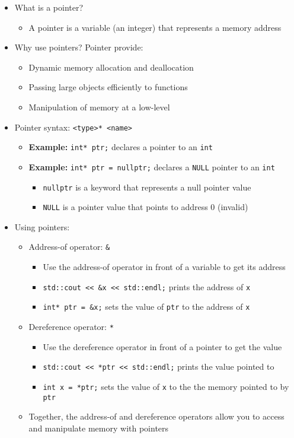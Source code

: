 \documentclass{article}
\begin{document}
\begin{itemize}
	\item What is a pointer?
	\begin{itemize}
		\item A pointer is a variable (an integer) that represents a memory address
	\end{itemize}
	\item Why use pointers? Pointer provide:
	\begin{itemize}
		\item Dynamic memory allocation and deallocation
		\item Passing large objects efficiently to functions
		\item Manipulation of memory at a low-level
	\end{itemize}
	\item Pointer syntax: \texttt{<type>* <name>}
	\begin{itemize}
		\item \textbf{Example:} \texttt{int* ptr;} declares a pointer to an \texttt{int}
		\item \textbf{Example:} \texttt{int* ptr = nullptr;} declares a \texttt{NULL} pointer to an \texttt{int}
		\begin{itemize}
			\item \texttt{nullptr} is a keyword that represents a null pointer value
			\item \texttt{NULL} is a pointer value that points to address 0 (invalid)
		\end{itemize}
	\end{itemize}
	\item Using pointers:
	\begin{itemize}
		\item Address-of operator: \texttt{\&}
		\begin{itemize}
			\item Use the address-of operator in front of a variable to get its address
			\item \texttt{std::cout << \&x << std::endl;} prints the address of \texttt{x}
			\item \texttt{int* ptr = \&x;} sets the value of \texttt{ptr} to the address of \texttt{x}
		\end{itemize}
		\item Dereference operator: \texttt{*}
		\begin{itemize}
			\item Use the dereference operator in front of a pointer to get the value
			\item \texttt{std::cout << *ptr << std::endl;} prints the value pointed to
			\item \texttt{int x = *ptr;} sets the value of \texttt{x} to the the memory pointed to by \texttt{ptr}
		\end{itemize}
		\item Together, the address-of and dereference operators allow you to access and manipulate memory with pointers
	\end{itemize}
\end{itemize}
\end{document}
